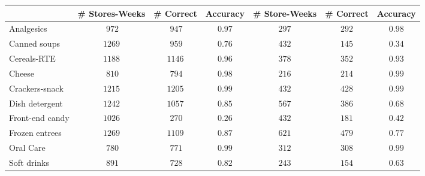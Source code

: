 {\small
\begin{center}
\begin{tabular}{lcccccc}
\hline\hline
\multicolumn{1}{l}{ }&\multicolumn{1}{c}{\# Stores-Weeks}&\multicolumn{1}{c}{\# Correct}&\multicolumn{1}{c}{Accuracy}&\multicolumn{1}{c}{\# Store-Weeks}&\multicolumn{1}{c}{\# Correct}&\multicolumn{1}{c}{Accuracy}\tabularnewline
\hline
Analgesics&$~972$&$~947$&$0.97$&$297$&$292$&$0.98$\tabularnewline
Canned soups&$1269$&$~959$&$0.76$&$432$&$145$&$0.34$\tabularnewline
Cereals-RTE&$1188$&$1146$&$0.96$&$378$&$352$&$0.93$\tabularnewline
Cheese&$~810$&$~794$&$0.98$&$216$&$214$&$0.99$\tabularnewline
Crackers-snack&$1215$&$1205$&$0.99$&$432$&$428$&$0.99$\tabularnewline
Dish detergent&$1242$&$1057$&$0.85$&$567$&$386$&$0.68$\tabularnewline
Front-end candy&$1026$&$~270$&$0.26$&$432$&$181$&$0.42$\tabularnewline
Frozen entrees&$1269$&$1109$&$0.87$&$621$&$479$&$0.77$\tabularnewline
Oral Care&$~780$&$~771$&$0.99$&$312$&$308$&$0.99$\tabularnewline
Soft drinks&$~891$&$~728$&$0.82$&$243$&$154$&$0.63$\tabularnewline
\hline
\end{tabular}\end{center}}
